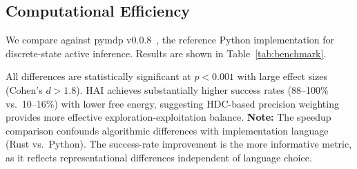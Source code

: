 \documentclass[10pt,letterpaper]{article}
\begin{document}
\subsection{Computational Efficiency}

We compare against pymdp v0.0.8~\cite{heins2022pymdp}, the reference Python implementation for discrete-state active inference. Results are shown in Table~\ref{tab:benchmark}.

\begin{table}[ht]
\centering
\caption{HAI vs.\ pymdp benchmark results.}
\label{tab:benchmark}
\small
{}
\end{table}

\begin{table}[ht]
\centering
\caption{Aggregate speedups with 95\% confidence intervals.}
\label{tab:speedups}
\small
{}
\end{table}

All differences are statistically significant at $p < 0.001$ with large effect sizes (Cohen's $d > 1.8$). HAI achieves substantially higher success rates (88--100\% vs.\ 10--16\%) with lower free energy, suggesting HDC-based precision weighting provides more effective exploration-exploitation balance. \textbf{Note:} The speedup comparison confounds algorithmic differences with implementation language (Rust vs.\ Python). The success-rate improvement is the more informative metric, as it reflects representational differences independent of language choice.
\end{document}
